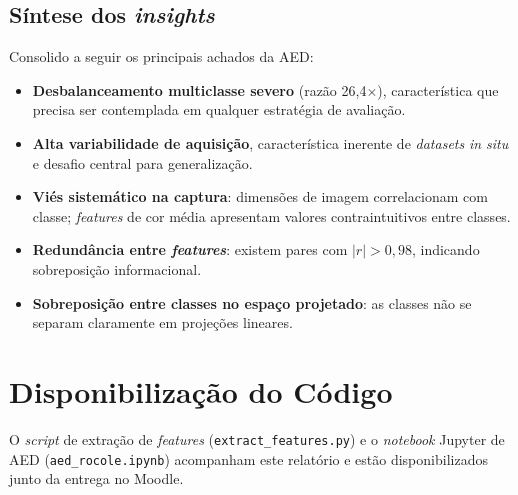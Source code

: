 \documentclass[11pt,a4paper]{article}
\begin{document}
\subsection{Síntese dos \textit{insights}}

Consolido a seguir os principais achados da AED:

\begin{itemize}
  \item \textbf{Desbalanceamento multiclasse severo} (razão 26,4$\times$), característica que precisa ser contemplada em qualquer estratégia de avaliação.
  \item \textbf{Alta variabilidade de aquisição}, característica inerente de \textit{datasets} \textit{in situ} e desafio central para generalização.
  \item \textbf{Viés sistemático na captura}: dimensões de imagem correlacionam com classe; \textit{features} de cor média apresentam valores contraintuitivos entre classes.
  \item \textbf{Redundância entre \textit{features}}: existem pares com $|r| > 0{,}98$, indicando sobreposição informacional.
  \item \textbf{Sobreposição entre classes no espaço projetado}: as classes não se separam claramente em projeções lineares.
\end{itemize}

\section*{Disponibilização do Código}

O \textit{script} de extração de \textit{features} (\texttt{extract\_features.py}) e o \textit{notebook} Jupyter de AED (\texttt{aed\_rocole.ipynb}) acompanham este relatório e estão disponibilizados junto da entrega no Moodle.
\end{document}
